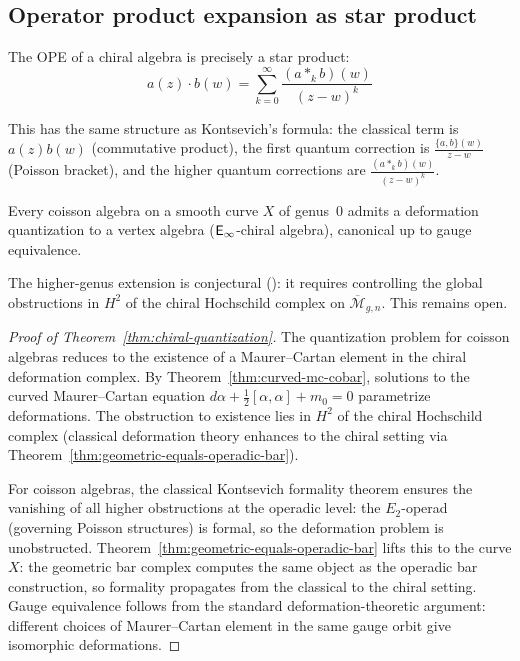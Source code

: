 \subsection{Operator product expansion as star product}

The OPE of a chiral algebra is precisely a star product:
\[a(z) \cdot b(w) = \sum_{k=0}^\infty \frac{(a *_k b)(w)}{(z-w)^k}\]

This has the same structure as Kontsevich's formula: the classical term is $a(z)b(w)$ (commutative product), the first quantum correction is $\frac{\{a, b\}(w)}{z-w}$ (Poisson bracket), and the higher quantum corrections are $\frac{(a *_k b)(w)}{(z-w)^k}$.

\begin{theorem}\label{thm:chiral-quantization}
Every coisson algebra on a smooth curve $X$ of genus~$0$ admits a deformation
quantization to a vertex algebra ($\mathsf{E}_{\infty}$-chiral algebra), canonical up to
gauge equivalence.
\end{theorem}

\begin{remark}\label{rem:chiral-quantization-higher-genus}
The higher-genus extension is conjectural (\ClaimStatusConjectured): it requires controlling the global obstructions in $H^2$ of the chiral Hochschild complex on $\overline{\mathcal{M}}_{g,n}$.  This remains open.
\end{remark}

\begin{proof}[Proof of Theorem~\ref{thm:chiral-quantization}]
The quantization problem for coisson algebras reduces to the existence of a Maurer--Cartan element in the chiral deformation complex.  By Theorem~\ref{thm:curved-mc-cobar}, solutions to the curved Maurer--Cartan equation $d\alpha + \frac{1}{2}[\alpha,\alpha] + m_0 = 0$ parametrize deformations.  The obstruction to existence lies in $H^2$ of the chiral Hochschild complex (classical deformation theory enhances to the chiral setting via Theorem~\ref{thm:geometric-equals-operadic-bar}).

For coisson algebras, the classical Kontsevich formality theorem ensures the vanishing of all higher obstructions at the operadic level: the $E_2$-operad (governing Poisson structures) is formal, so the deformation problem is unobstructed.  Theorem~\ref{thm:geometric-equals-operadic-bar} lifts this to the curve $X$: the geometric bar complex computes the same object as the operadic bar construction, so formality propagates from the classical to the chiral setting.  Gauge equivalence follows from the standard deformation-theoretic argument: different choices of Maurer--Cartan element in the same gauge orbit give isomorphic deformations.
\end{proof}

